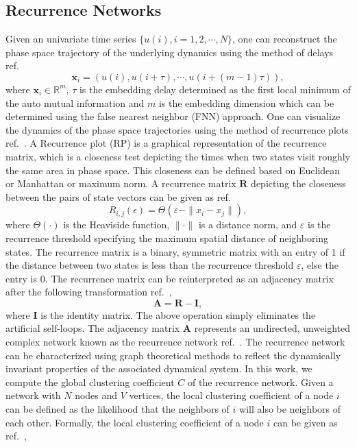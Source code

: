 \documentclass[a4paper]{jpconf}
\begin{document}
\subsection{Recurrence Networks}
Given an univariate time series $\{u(i) , i = 1,2, \cdots ,N \}$, one can reconstruct the phase space trajectory of the underlying dynamics using the method of delays ref.~\cite{takens1981detecting}
\begin{equation}
\mathbf{x}_{i} = (u(i),u(i+\tau),\cdots,u(i+(m-1)\tau)),
\end{equation}
where $\mathbf{x}_{i} \in \mathbb{R}^m$, $\tau$ is the embedding delay determined as the first local minimum of the auto mutual information and $m$ is the embedding dimension which can be determined using the false nearest neighbor (FNN) approach. One can visualize the dynamics of the phase space trajectories using the method of recurrence plots ref.~\cite{eckmann1987recurrence}. A Recurrence plot (RP) is a graphical representation of the recurrence matrix, which is a closeness test depicting the times when two states visit roughly the same area in phase space. This closeness can be defined based on Euclidean or Manhattan or maximum norm. A recurrence matrix $\mathbf{R}$ depicting the closeness between the pairs of state vectors can be given as ref.~\cite{marwan2009complex,donner2010recurrence}
\begin{equation}
R_{i,j}(\epsilon)=\Theta(\varepsilon - \| x_{i}-x_{j}\|),
\end{equation}
where $\Theta(\cdot)$ is the Heaviside function, $\|\cdot\|$ is a distance norm, and $\varepsilon $ is the recurrence threshold specifying the maximum spatial distance of neighboring states. The recurrence matrix is a binary, symmetric matrix with an entry of 1 if the distance between two states is less than the recurrence threshold $\varepsilon$, else the entry is 0. The recurrence matrix can be reinterpreted as an adjacency matrix after the following transformation ref.~\cite{marwan2009complex,donner2010recurrence},
\begin{equation}
\mathbf{A} = \mathbf{R}-\mathbf{I},
\end{equation}
where $\mathbf{I}$ is the identity matrix. The above operation simply eliminates the artificial self-loops. The adjacency matrix $\mathbf{A}$ represents an undirected, unweighted complex network known as the recurrence network ref.~\cite{donner2010recurrence}. 
The recurrence network can be characterized using graph theoretical methods to reflect the dynamically invariant properties of the associated dynamical system. In this work, we compute the global clustering coefficient $C$ of the recurrence network. Given a network with $N$ nodes and $V$ vertices, the local clustering coefficient of a node $i$ can be defined as the likelihood that the neighbors of $i$ will also be neighbors of each other. Formally, the local clustering coefficient of a node $i$ can be given as ref.~\cite{watts1998collective},
\end{document}
